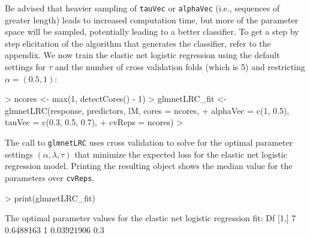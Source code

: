 \documentclass{article}
\begin{document}
Be advised that heavier sampling of {\tt tauVec} or {\tt alphaVec} (i.e., sequences of greater length) leads to increased computation time, but more of the parameter space will be sampled, potentially leading to a better classifier. To get a step by step elicitation of the algorithm that generates the classifier, refer to the appendix.  We now train the elastic net logistic regression using the default settings for $\tau$ and the number of cross validation
folds (which is 5) and restricting $\alpha = (0.5, 1)$:
\begin{Schunk}
\begin{Sinput}
> ncores <- max(1, detectCores() - 1)
> glmnetLRC_fit <- glmnetLRC(response, predictors, lM, cores = ncores,
+                             alphaVec = c(1, 0.5), tauVec = c(0.3, 0.5, 0.7),
+                             cvReps = ncores)
> 
\end{Sinput}
\end{Schunk}

\noindent The call to {\tt glmnetLRC} uses cross validation to solve for the optimal parameter settings $\left(\alpha, \lambda, \tau\right)$ that minimize the expected loss for the elastic net logistic regression model. Printing the resulting object shows the median value for the parameters over {\tt cvReps}.
 
\begin{Schunk}
\begin{Sinput}
> print(glmnetLRC_fit)
\end{Sinput}
\begin{Soutput}
The optimal parameter values for the elastic net logistic regression fit: 
     Df      %
[1,]  7 0.6488163     1 0.03921906 0.3
\end{Soutput}
\end{Schunk}
 
\end{document}
